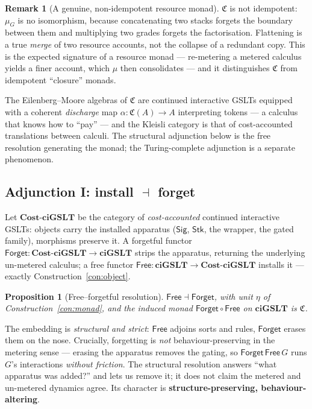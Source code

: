 \documentclass[11pt]{article}
\theoremstyle{definition}
\newtheorem{remark}[definition]{Remark}
\theoremstyle{plain}
\newtheorem{proposition}[definition]{Proposition}
\newcommand{\ciGSLT}{\mathbf{ciGSLT}}
\newcommand{\CostC}{\mathbf{Cost}\text{-}\ciGSLT}
\newcommand{\Free}{\mathsf{Free}}
\newcommand{\Forget}{\mathsf{Forget}}
\newcommand{\Sig}{\mathsf{Sig}}
\newcommand{\Tok}{\mathsf{Stk}}
\newcommand{\Cost}{\mathfrak{C}}              %
\begin{document}
\begin{remark}[A genuine, non-idempotent resource monad]
$\Cost$ is not idempotent: $\mu_G$ is no isomorphism, because
concatenating two stacks forgets the boundary between them and
multiplying two grades forgets the factorisation. Flattening is a true
\emph{merge} of two resource accounts, not the collapse of a redundant
copy. This is the expected signature of a resource monad --- re-metering a
metered calculus yields a finer account, which $\mu$ then consolidates ---
and it distinguishes $\Cost$ from idempotent ``closure'' monads.
\end{remark}

The Eilenberg--Moore algebras of $\Cost$ are continued interactive GSLTs
equipped with a coherent \emph{discharge} map $\alpha : \Cost(A) \to A$
interpreting tokens --- a calculus that knows how to ``pay'' --- and the
Kleisli category is that of cost-accounted translations between calculi.
The structural adjunction below is the free resolution generating the
monad; the Turing-complete adjunction is a separate phenomenon.

\subsection{Adjunction I: install \texorpdfstring{$\dashv$}{-|} forget}

Let $\CostC$ be the category of \emph{cost-accounted} continued
interactive GSLTs: objects carry the installed apparatus
($\Sig$, $\Tok$, the wrapper, the gated family), morphisms preserve it.
A forgetful functor $\Forget : \CostC \to \ciGSLT$ strips the apparatus,
returning the underlying un-metered calculus; a free functor
$\Free : \ciGSLT \to \CostC$ installs it --- exactly
Construction~\ref{con:object}.

\begin{proposition}[Free--forgetful resolution]
\label{prop:adj1}
$\Free \dashv \Forget$, with unit $\eta$ of Construction~\ref{con:monad},
and the induced monad $\Forget \circ \Free$ on $\ciGSLT$ is $\Cost$.
\end{proposition}

The embedding is \emph{structural and strict}: $\Free$ adjoins sorts and
rules, $\Forget$ erases them on the nose. Crucially, forgetting is
\emph{not} behaviour-preserving in the metering sense --- erasing the
apparatus removes the gating, so $\Forget\,\Free\,G$ runs $G$'s
interactions \emph{without friction}. The structural resolution answers
``what apparatus was added?'' and lets us remove it; it does not claim the
metered and un-metered dynamics agree. Its character is
\textbf{structure-preserving, behaviour-altering}.
\end{document}
